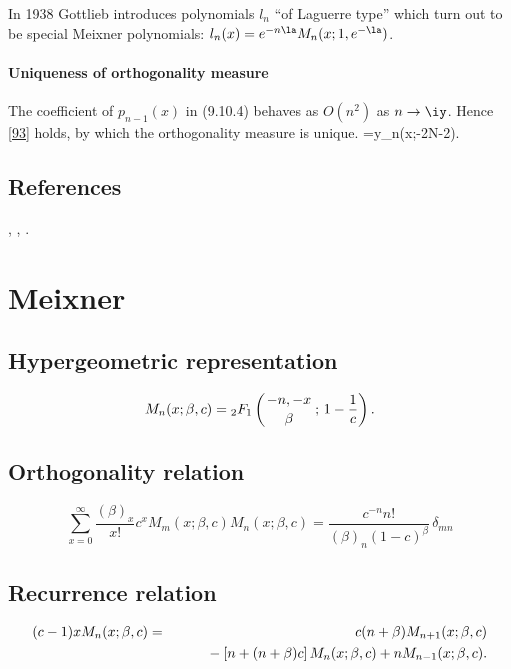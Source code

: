 \documentclass[envcountchap,graybox]{svmono}
\newcommand{\hyp}[5]{\mbox{}_{#1}{F}_{#2}
\left(\genfrac{}{}{0pt}{}{#3}{#4}\,;\,#5\right)}
\newcommand{\mathindent}{\hspace{7.5mm}}
\begin{document}
In 1938 Gottlieb \cite[\S2]{K1} introduces polynomials $l_n$ ``of Laguerre type''
which turn out to be special Meixner polynomials:
$l_n(x)=e^{-n\la} M_n(x;1,e^{-\la})$.
%
\paragraph{Uniqueness of orthogonality measure}
The coefficient of $p_{n-1}(x)$ in (9.10.4) behaves as $O(n^2)$ as $n\to\iy$.
Hence \eqref{93} holds, by which the orthogonality measure is unique.
=y_n(x;-2N-2).$$

\subsection*{References}
\cite{Askey87}, \cite{BorodinOlshanski}, \cite{Lesky96}.


\section{Meixner}

\par\setcounter{equation}{0}

\subsection*{Hypergeometric representation}
\begin{equation}
\label{DefMeixner}
M_n(x;\beta,c)=\hyp{2}{1}{-n,-x}{\beta}{1-\frac{1}{c}}.
\end{equation}

\subsection*{Orthogonality relation}
\begin{equation}
\label{OrtMeixner}
\sum_{x=0}^{\infty}\frac{(\beta)_x}{x!}c^xM_m(x;\beta,c)M_n(x;\beta,c)
{}=\frac{c^{-n}n!}{(\beta)_n(1-c)^{\beta}}\,\delta_{mn}
\end{equation}

\subsection*{Recurrence relation}
\begin{eqnarray}
\label{RecMeixner}
(c-1)xM_n(x;\beta,c)&=&c(n+\beta)M_{n+1}(x;\beta,c)\nonumber\\
& &{}\mathindent{}-\left[n+(n+\beta)c\right]M_n(x;\beta,c)+nM_{n-1}(x;\beta,c).
\end{eqnarray}
\end{document}

